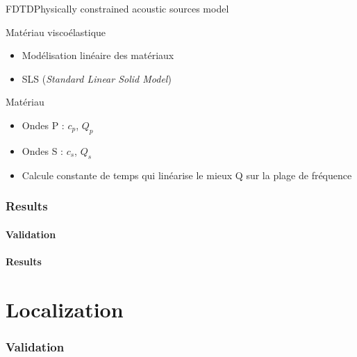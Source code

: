 \documentclass[9pt, xcolor={usenames, dvipsnames}]{beamer}
\begin{document}
				\begin{frame}{FDTD}{Physically constrained acoustic sources model}
					\begin{minipage}[t]{0.48\textwidth}
						\begin{block}{Matériau viscoélastique}
							\begin{itemize}
								\item Modélisation linéaire des matériaux~\cite{blanch1995Q}
								\item SLS (\textit{Standard Linear Solid Model})
							\end{itemize}
						\end{block}
						
					\end{minipage}
					\hfill
					\begin{minipage}[t]{0.48\textwidth}
						\begin{block}{Matériau}
							\begin{itemize}
								\item Ondes P : $c_p$, $Q_p$
								\item Ondes S : $c_s$, $Q_s$
								\item Calcule constante de temps qui linéarise le mieux Q sur la plage de fréquence
							\end{itemize}
						\end{block}
					\end{minipage}
				\end{frame}
		
		\section{Results}
			
			\subsection{Validation}

			\subsection{Results}

	\part{Localization}

	\section{Validation}
\end{document}
